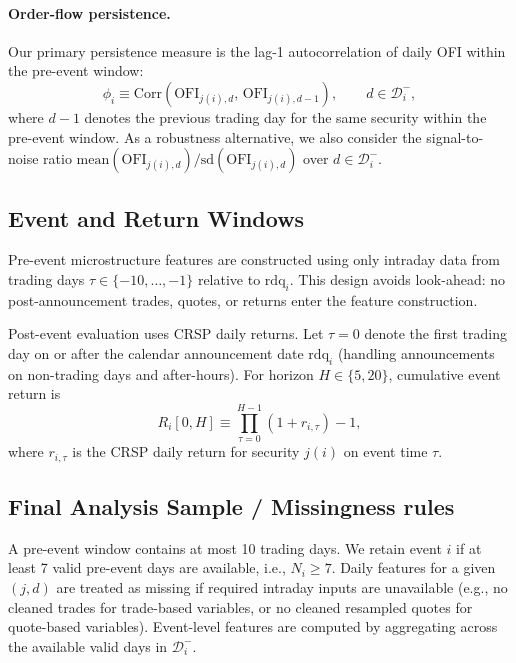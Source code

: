 \paragraph{Order-flow persistence.}
Our primary persistence measure is the lag-1 autocorrelation of daily OFI within the pre-event window:
\begin{equation}
\phi_i \equiv \mathrm{Corr}\!\left(\mathrm{OFI}_{j(i),d},\,\mathrm{OFI}_{j(i),d-1}\right),\qquad d\in\mathcal{D}_i^{-},
\end{equation}
where $d-1$ denotes the previous trading day for the same security within the pre-event window.
As a robustness alternative, we also consider the signal-to-noise ratio $\mathrm{mean}(\mathrm{OFI}_{j(i),d})/\mathrm{sd}(\mathrm{OFI}_{j(i),d})$ over $d\in\mathcal{D}_i^{-}$.

\subsection{Event and Return Windows}

Pre-event microstructure features are constructed using only intraday data from trading days $\tau\in\{-10,\ldots,-1\}$ relative to $\mathrm{rdq}_i$.
This design avoids look-ahead: no post-announcement trades, quotes, or returns enter the feature construction.

Post-event evaluation uses CRSP daily returns.
Let $\tau=0$ denote the first trading day on or after the calendar announcement date $\mathrm{rdq}_i$ (handling announcements on non-trading days and after-hours).
For horizon $H\in\{5,20\}$, cumulative event return is
\begin{equation}
R_i[0,H] \equiv \prod_{\tau=0}^{H-1} (1+r_{i,\tau}) - 1,
\end{equation}
where $r_{i,\tau}$ is the CRSP daily return for security $j(i)$ on event time $\tau$.

\subsection{Final Analysis Sample / Missingness rules}

A pre-event window contains at most 10 trading days.
We retain event $i$ if at least 7 valid pre-event days are available, i.e., $N_i\ge 7$.
Daily features for a given $(j,d)$ are treated as missing if required intraday inputs are unavailable (e.g., no cleaned trades for trade-based variables, or no cleaned resampled quotes for quote-based variables).
Event-level features are computed by aggregating across the available valid days in $\mathcal{D}_i^{-}$.

